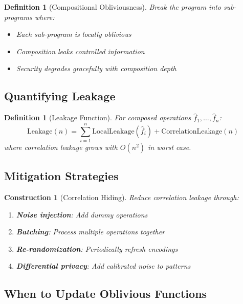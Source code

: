 \documentclass[11pt,final]{article}
\newtheorem{definition}[theorem]{Definition}
\newtheorem{construction}[theorem]{Construction}
\begin{document}
\begin{definition}[Compositional Obliviousness]
Break the program into sub-programs where:
\begin{itemize}
    \item Each sub-program is locally oblivious
    \item Composition leaks controlled information
    \item Security degrades gracefully with composition depth
\end{itemize}
\end{definition}

\subsection{Quantifying Leakage}

\begin{definition}[Leakage Function]
For composed operations $\hat{f}_1, \ldots, \hat{f}_n$:
\begin{equation}
\text{Leakage}(n) = \sum_{i=1}^{n} \text{LocalLeakage}(\hat{f}_i) + \text{CorrelationLeakage}(n)
\end{equation}
where correlation leakage grows with $O(n^2)$ in worst case.
\end{definition}

\subsection{Mitigation Strategies}

\begin{construction}[Correlation Hiding]
Reduce correlation leakage through:
\begin{enumerate}
    \item \textbf{Noise injection}: Add dummy operations
    \item \textbf{Batching}: Process multiple operations together
    \item \textbf{Re-randomization}: Periodically refresh encodings
    \item \textbf{Differential privacy}: Add calibrated noise to patterns
\end{enumerate}
\end{construction}

\subsection{When to Update Oblivious Functions}
\end{document}
